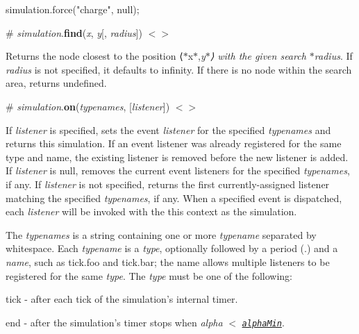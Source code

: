 \begin{DoxyCode}
simulation.force("charge", null);
\end{DoxyCode}


\label{_simulation_find}%
\# {\itshape simulation}.{\bfseries find}({\itshape x}, {\itshape y}\mbox{[}, {\itshape radius}\mbox{]}) \href{https://github.com/d3/d3-force/blob/master/src/simulation.js#L116}{\tt $<$$>$}

Returns the node closest to the position ⟨$\ast$x$\ast$,{\itshape y$\ast$⟩ with the given search $\ast$radius}. If {\itshape radius} is not specified, it defaults to infinity. If there is no node within the search area, returns undefined.

\label{_simulation_on}%
\# {\itshape simulation}.{\bfseries on}({\itshape typenames}, \mbox{[}{\itshape listener}\mbox{]}) \href{https://github.com/d3/d3-force/blob/master/src/simulation.js#L139}{\tt $<$$>$}

If {\itshape listener} is specified, sets the event {\itshape listener} for the specified {\itshape typenames} and returns this simulation. If an event listener was already registered for the same type and name, the existing listener is removed before the new listener is added. If {\itshape listener} is null, removes the current event listeners for the specified {\itshape typenames}, if any. If {\itshape listener} is not specified, returns the first currently-\/assigned listener matching the specified {\itshape typenames}, if any. When a specified event is dispatched, each {\itshape listener} will be invoked with the {\ttfamily this} context as the simulation.

The {\itshape typenames} is a string containing one or more {\itshape typename} separated by whitespace. Each {\itshape typename} is a {\itshape type}, optionally followed by a period ({\ttfamily .}) and a {\itshape name}, such as {\ttfamily tick.\+foo} and {\ttfamily tick.\+bar}; the name allows multiple listeners to be registered for the same {\itshape type}. The {\itshape type} must be one of the following\+:


\begin{DoxyItemize}
\item {\ttfamily tick} -\/ after each tick of the simulation’s internal timer.
\item {\ttfamily end} -\/ after the simulation’s timer stops when {\itshape alpha} $<$ \href{#simulation_alphaMin}{\tt {\itshape alpha\+Min}}.
\end{DoxyItemize}

